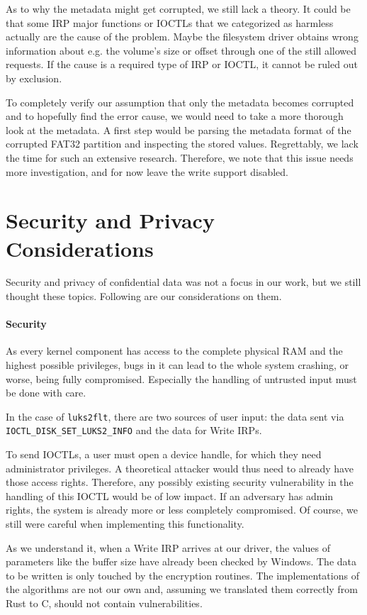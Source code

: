 As to why the metadata might get corrupted, we still lack a theory. It could be that some IRP major functions or IOCTLs that we categorized as harmless actually are the cause of the problem. Maybe the filesystem driver obtains wrong information about e.g. the volume's size or offset through one of the still allowed requests. If the cause is a required type of IRP or IOCTL, it cannot be ruled out by exclusion.

To completely verify our assumption that only the metadata becomes corrupted and to hopefully find the error cause, we would need to take a more thorough look at the metadata. A first step would be parsing the metadata format of the corrupted FAT32 partition and inspecting the stored values. Regrettably, we lack the time for such an extensive research. Therefore, we note that this issue needs more investigation, and for now leave the write support disabled.

\section{Security and Privacy Considerations}
\label{chap:ourapproach.security}
Security and privacy of confidential data was not a focus in our work, but we still thought these topics. Following are our considerations on them.

\paragraph{Security}
As every kernel component has access to the complete physical RAM and the highest possible privileges, bugs in it can lead to the whole system crashing, or worse, being fully compromised. Especially the handling of untrusted input must be done with care.

In the case of \texttt{luks2flt}, there are two sources of user input: the data sent via \texttt{IOCTL\_DISK\_SET\_LUKS2\_INFO} and the data for Write IRPs.

To send IOCTLs, a user must open a device handle, for which they need administrator privileges. A theoretical attacker would thus need to already have those access rights. Therefore, any possibly existing security vulnerability in the handling of this IOCTL would be of low impact. If an adversary has admin rights, the system is already more or less completely compromised. Of course, we still were careful when implementing this functionality.

As we understand it, when a Write IRP arrives at our driver, the values of parameters like the buffer size have already been checked by Windows. The data to be written is only touched by the encryption routines. The implementations of the algorithms are not our own and, assuming we translated them correctly from Rust to C, should not contain vulnerabilities.

